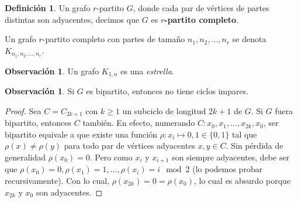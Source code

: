 \documentclass[12pt]{report}
\theoremstyle{plain}
\theoremstyle{definition}
\newtheorem{definition}[theorem]{Definición}
\newtheorem{obs}[theorem]{Observación}
\begin{document}

\begin{definition}
Un grafo $r$-partito $G$, donde cada par de vértices de partes distintas son adyacentes, decimos que $G$ es \textbf{$r$-partito completo}.

Un grafo $r$-partito completo con partes de tamaño $n_1,n_2,\ldots, n_r$ se denota $K_{n_1,n_2,\ldots, n_r}$.

\end{definition}

\begin{obs}
Un grafo $K_{1,n}$ es una \textit{estrella}.

\end{obs}

\begin{obs}
Si $G$ es bipartito, entonces no tiene ciclos impares.
\end{obs}
\begin{proof}
Sea $C=C_{2k+1}$ con $k \geq 1$ un subciclo de longitud $2k+1$ de $G$. Si $G$ fuera bipartito, entonces $C$ también. En efecto, numerando $C : x_0, x_1, \ldots, x_{2k} , x_0$, ser bipartito equivale a que existe una función $\rho : x_i \mapsto 0, 1 \in \{ 0 , 1 \}$ tal que $\rho (x) \neq \rho (y)$ para todo par de vértices adyacentes $x,y \in C$. Sin pérdida de generalidad $\rho (x_0 ) = 0$. Pero como $x_i$ y $x_{i+1}$ son siempre adyacentes, debe ser que $\rho (x_0 ) =  0 , \rho (x_1) = 1 , \ldots , \rho (x_i) = i \mod 2$ (lo podemos probar recursivamente). Con lo cual, $\rho ( x_{2k}) = 0 = \rho ( x_0)$, lo cual es absurdo porque $x_{2k}$ y $x_0$ son adyacentes.
\end{proof}


\end{document}

